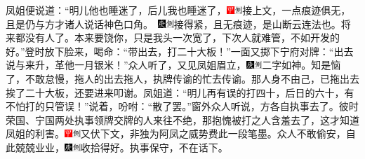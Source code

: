 凤姐便说道：``明儿他也睡迷了，后儿我也睡迷了，{\includegraphics[width=3mm]{../Images/00002}\includegraphics[width=3mm]{../Images/00011}\footnotesize \kaishu 接上文，一点痕迹俱无，且是仍与方才诸人说话神色口角。　\includegraphics[width=3mm]{../Images/00004}\includegraphics[width=3mm]{../Images/00011}\footnotesize \kaishu 接得紧，且无痕迹，是山断云连法也。}将来都没有人了。本来要饶你，只是我头一次宽了，下次人就难管，不如开发的好。''登时放下脸来，喝命：``带出去，打二十大板！''一面又掷下宁府对牌：``出去说与来升，革他一月银米！''众人听了，又见凤姐眉立，{\includegraphics[width=3mm]{../Images/00004}\includegraphics[width=3mm]{../Images/00011}\footnotesize \kaishu 二字如神。}知是恼了，不敢怠慢，拖人的出去拖人，执牌传谕的忙去传谕。那人身不由己，已拖出去挨了二十大板，还要进来叩谢。凤姐道：``明儿再有误的打四十，后日的六十，有不怕打的只管误！''说着，吩咐：``散了罢。''窗外众人听说，方各自执事去了。彼时荣国、宁国两处执事领牌交牌的人来往不绝，那抱愧被打之人含羞去了，这才知道凤姐的利害。{\includegraphics[width=3mm]{../Images/00002}\includegraphics[width=3mm]{../Images/00011}\footnotesize \kaishu 又伏下文，非独为阿凤之威势费此一段笔墨。}众人不敢偷安，自此兢兢业业，{\includegraphics[width=3mm]{../Images/00004}\includegraphics[width=3mm]{../Images/00011}\footnotesize \kaishu 收拾得好。}执事保守，不在话下。

